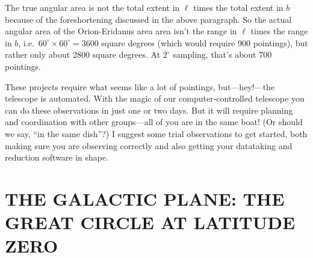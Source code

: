 \documentclass[preprint]{aastex}
\begin{document}
The true angular area is not the total extent in $\ell$ times the total
extent in $b$ because of the foreshortening discussed in the above
paragraph. So the actual angular area of the Orion-Eridanus area area
isn't the range in $\ell$ times the range in $b$, i.e.\ $60^\circ
\times 60^\circ = 3600$ square degrees (which would require 900
pointings), but rather only about 2800 square degrees.  At $2^\circ$
sampling, that's about 700 pointings.

These projects require what seems like a lot of pointings,
but---hey!---the telescope is automated. With the magic of our
computer-controlled telescope you can do these observations in just one
or two days. But it will require planning and coordination with other
groups---all of you are in the same boat! (Or should we say, ``in the
same dish''?) I suggest some trial observations to get started, both
making sure you are observing correctly and also getting your datataking
and reduction software in shape.

\section{THE GALACTIC PLANE: THE GREAT CIRCLE AT LATITUDE ZERO 
} 
\label{galacticplane}
\end{document}
